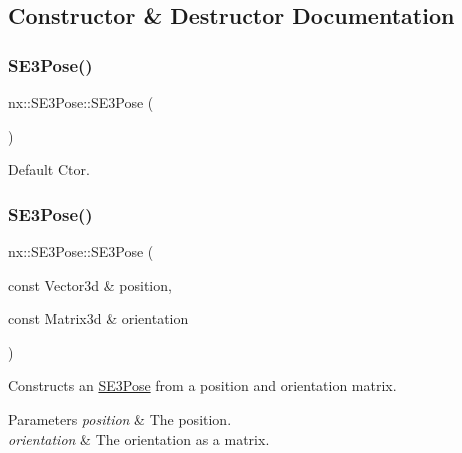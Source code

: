 \subsection{Constructor \& Destructor Documentation}
\mbox{\label{structnx_1_1SE3Pose_ad53ace38f70c31c09e994404470cafc5}} 
\subsubsection{\texorpdfstring{S\+E3\+Pose()}{SE3Pose()}\hspace{0.1cm}{\footnotesize\ttfamily [1/3]}}
{\footnotesize\ttfamily nx\+::\+S\+E3\+Pose\+::\+S\+E3\+Pose (\begin{DoxyParamCaption}{ }\end{DoxyParamCaption})\hspace{0.3cm}{\ttfamily [inline]}}

Default Ctor. \mbox{\label{structnx_1_1SE3Pose_aedb0fbcfde8aaad17536e6401a70016f}} 
\subsubsection{\texorpdfstring{S\+E3\+Pose()}{SE3Pose()}\hspace{0.1cm}{\footnotesize\ttfamily [2/3]}}
{\footnotesize\ttfamily nx\+::\+S\+E3\+Pose\+::\+S\+E3\+Pose (\begin{DoxyParamCaption}\item[{const Vector3d \&}]{position,  }\item[{const Matrix3d \&}]{orientation }\end{DoxyParamCaption})\hspace{0.3cm}{\ttfamily [inline]}}

Constructs an \hyperlink{structnx_1_1SE3Pose}{S\+E3\+Pose} from a position and orientation matrix. 
\begin{DoxyParams}{Parameters}
{\em position} & The position. \\
\hline
{\em orientation} & The orientation as a matrix. \\
\hline
\end{DoxyParams}
\mbox{\label{structnx_1_1SE3Pose_a4dadedbf18209a190442ab3e5a9717da}} 
